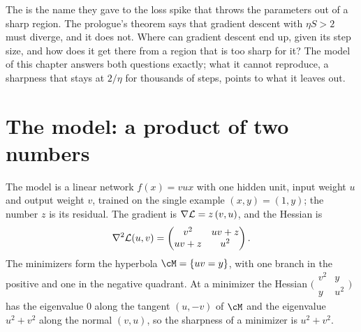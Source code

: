\begin{refsection}
The  is the name they gave to the loss spike that throws the parameters out of a sharp region. The prologue's theorem says that gradient descent with $\eta S>2$ must diverge, and it does not. Where can gradient descent end up, given its step size, and how does it get there from a region that is too sharp for it? The model of this chapter answers both questions exactly; what it cannot reproduce, a sharpness that stays at $2/\eta$ for thousands of steps, points to what it leaves out.

\section{The model: a product of two numbers}\label{sec:stability:model}


The model is a linear network $f(x)=vux$ with one hidden unit, input weight $u$ and output weight $v$, trained on the single example $(x,y)=(1,y)$; the number $z$ is its residual. The gradient is $\nabla\mathcal{L}=z\,(v,u)$, and the Hessian is
\[
  \nabla^2\mathcal{L}(u,v)=\begin{pmatrix} v^2 & uv+z\\ uv+z & u^2\end{pmatrix}.
\]
The minimizers form the hyperbola $\cM=\{uv=y\}$, with one branch in the positive and one in the negative quadrant. At a minimizer the Hessian $\bigl(\begin{smallmatrix}v^2&y\\y&u^2\end{smallmatrix}\bigr)$ has the eigenvalue $0$ along the tangent $(u,-v)$ of $\cM$ and the eigenvalue $u^2+v^2$ along the normal $(v,u)$, so the sharpness of a minimizer is $u^2+v^2$.


\end{refsection}
